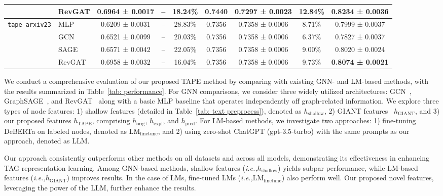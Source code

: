 \documentclass{article}
\newcommand{\ie}{\emph{i.e.,}\xspace}
\begin{document}
\begin{table}[!ht]
\begin{tabular}{llccccccc}
    \\
     & RevGAT
    & 0.6964 ± 0.0017
    & --
    & 18.24\%
    & 0.7440
    & 0.7297 ± 0.0023
    & 12.84\% 
    & \textbf{0.8234 ± 0.0036}
    \\
    \midrule
    \multirow{4}{*}{\texttt{tape-arxiv23}} 
    & MLP 
    & 0.6209 ± 0.0031
    & -- 
    & 28.83\%
    & 0.7356
    & 0.7358 ± 0.0006
    & 8.71\%
    & 0.7999 ± 0.0037
    \\
    & GCN 
    & 0.6521 ± 0.0099
    & -- 
    & 20.03\%
    & 0.7356 
    & 0.7358 ± 0.0006
    & 6.37\%
    & 0.7827 ± 0.0037
    \\
    & SAGE 
    & 0.6571 ± 0.0042
    & -- 
    & 22.05\%
    & 0.7356 
    & 0.7358 ± 0.0006
    & 9.00\%
    & 0.8020 ± 0.0024
    \\
    & RevGAT 
    & 0.6958 ± 0.0032
    & -- 
    & 16.04\%
    & 0.7356
    & 0.7358 ± 0.0006
    & 9.73\%
    & \textbf{0.8074 ± 0.0021}
    \\
    \bottomrule    
    \end{tabular}
    
\end{table}
We conduct a comprehensive evaluation of our proposed TAPE method by comparing with existing GNN- and LM-based methods, with the results summarized in Table~\ref{tab: performance}. For GNN comparisons, we consider three widely utilized architectures:  GCN~\citep{kipf2016semi_gcn}, GraphSAGE~\citep{sun2021scalable_sagn}, and RevGAT~\citep{li2021training_revgat} along with a basic MLP baseline that operates independently off graph-related information. We explore three types of node features: 1) shallow features (detailed in Table~\ref{tab: text preprocess}), denoted as $h_\textrm{shallow}$, 2) GIANT features~\citep{chien2021node_giant} $h_\textrm{GIANT}$, and 3) our proposed features $h_\textrm{TAPE}$, comprising $h_\textrm{orig}$, $h_\textrm{expl}$, and $h_\textrm{pred}$. For LM-based methods, we investigate two approaches: 1) fine-tuning DeBERTa on labeled nodes, denoted as $\textrm{LM}_\textrm{finetune}$, and 2) using zero-shot ChatGPT (gpt-3.5-turbo) with the same prompts as our approach, denoted as $\textrm{LLM}$. 

Our approach consistently outperforms other methods on all datasets and across all  models, demonstrating its effectiveness in enhancing TAG representation learning. Among GNN-based methods, shallow features (\ie $h_\textrm{shallow}$) yields subpar performance, while LM-based features (\ie $h_\textrm{GIANT}$) improves results. In the case of LMs, fine-tuned LMs (\ie $\textrm{LM}_\textrm{finetune}$) also perform well. Our proposed novel features, leveraging the power of the LLM, further enhance the results.  
\end{document}

